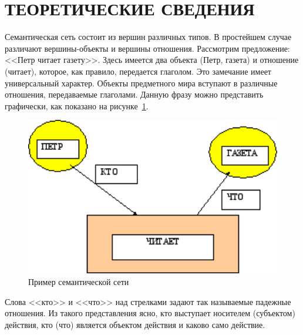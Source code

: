 \section{ТЕОРЕТИЧЕСКИЕ СВЕДЕНИЯ}

Семантическая сеть состоит из вершин различных типов.
В простейшем случае различают вершины-объекты и вершины отношения.
Рассмотрим предложение: <<Петр читает газету>>.
Здесь имеется два объекта (Петр, газета) и отношение (читает),
которое, как правило, передается глаголом.
Это замечание имеет универсальный характер.
Объекты предметного мира вступают в различные отношения, передаваемые глаголами.
Данную фразу можно представить графически,
как показано на рисунке~\ref{fig:sem_network}.

\begin{figure}[h!]
  \centering
  \includegraphics[width=120mm]{img/sem_network}
  \caption{Пример семантической сети}
  \label{fig:sem_network}
\end{figure}

Слова <<кто>> и <<что>> над стрелками задают так называемые
падежные отношения.
Из такого представления ясно, кто выступает носителем
(субъектом) действия, кто (что) является объектом действия и
каково само действие.

\newpage